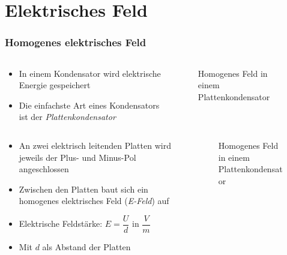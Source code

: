 
\section{Elektrisches Feld}
\label{section:e_feld}
\begin{frame}%

\frametitle{Homogenes elektrisches Feld}
\begin{columns}
    \begin{column}{0.48\textwidth}
    \begin{itemize}
  \item In einem Kondensator wird elektrische Energie gespeichert
  \item Die einfachste Art eines Kondensators ist der \emph{Plattenkondensator}
  \end{itemize}

    \end{column}
   \begin{column}{0.48\textwidth}
       
\begin{figure}
    \caption{\scriptsize Homogenes Feld in einem Plattenkondensator}
    \label{e_kondensator_homogenes_feld}
\end{figure}


   \end{column}
\end{columns}

\end{frame}

\begin{frame}
\begin{columns}
    \begin{column}{0.48\textwidth}
    \begin{itemize}
  \item An zwei elektrisch leitenden Platten wird jeweils der Plus- und Minus-Pol angeschlossen
  \item Zwischen den Platten baut sich ein homogenes elektrisches Feld (\emph{E-Feld}) auf
  \item Elektrische Feldstärke: $E = \dfrac{U}{d}$ in $\dfrac{V}{m}$
  \item Mit $d$ als Abstand der Platten
  \end{itemize}

    \end{column}
   \begin{column}{0.48\textwidth}
       
\begin{figure}
    \caption{\scriptsize Homogenes Feld in einem Plattenkondensator}
    \label{e_kondensator_homogenes_feld}
\end{figure}


   \end{column}
\end{columns}

\end{frame}

